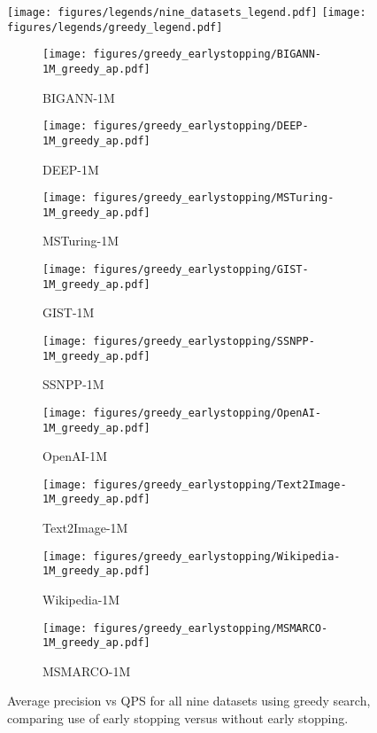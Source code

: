 \begin{figure*}
	\centering
	\texttt{[image: figures/legends/nine\_datasets\_legend.pdf]}
	\texttt{[image: figures/legends/greedy\_legend.pdf]} \\
	\begin{subfigure}{.33\textwidth}
		\texttt{[image: figures/greedy\_earlystopping/BIGANN-1M\_greedy\_ap.pdf]}
		\caption{BIGANN-1M}\label{fig:bigannpp_greedy}
	\end{subfigure} 
	\begin{subfigure}{.33\textwidth}
		\texttt{[image: figures/greedy\_earlystopping/DEEP-1M\_greedy\_ap.pdf]}
		\caption{DEEP-1M}\label{fig:deeppp_greedy}
	\end{subfigure}
	\begin{subfigure}{.33\textwidth}
		\texttt{[image: figures/greedy\_earlystopping/MSTuring-1M\_greedy\_ap.pdf]}
		\caption{MSTuring-1M}\label{fig:msturingpp_greedy}
	\end{subfigure}\hfil
	\begin{subfigure}{.3\textwidth}
		\texttt{[image: figures/greedy\_earlystopping/GIST-1M\_greedy\_ap.pdf]}
		\caption{GIST-1M}\label{fig:gistpp_greedy}
	\end{subfigure} 
	\begin{subfigure}{.33\textwidth}
		\texttt{[image: figures/greedy\_earlystopping/SSNPP-1M\_greedy\_ap.pdf]}
		\caption{SSNPP-1M}\label{fig:ssnpppp_greedy}
	\end{subfigure}
	\begin{subfigure}{.33\textwidth}
		\texttt{[image: figures/greedy\_earlystopping/OpenAI-1M\_greedy\_ap.pdf]}
		\caption{OpenAI-1M}\label{fig:openaipp_greedy}
	\end{subfigure}\hfil
	\begin{subfigure}{.33\textwidth}
		\texttt{[image: figures/greedy\_earlystopping/Text2Image-1M\_greedy\_ap.pdf]}
		\caption{Text2Image-1M}\label{fig:t2ipp_greedy}
	\end{subfigure} 
	\begin{subfigure}{.33\textwidth}
		\texttt{[image: figures/greedy\_earlystopping/Wikipedia-1M\_greedy\_ap.pdf]}
		\caption{Wikipedia-1M}\label{fig:wikipp_greedy}
	\end{subfigure}
	\begin{subfigure}{.33\textwidth}
		\texttt{[image: figures/greedy\_earlystopping/MSMARCO-1M\_greedy\_ap.pdf]}
		\caption{MSMARCO-1M}\label{fig:msmarcopp_greedy}
	\end{subfigure}
	\caption{Average precision vs QPS for all nine datasets using greedy search, comparing use of early stopping versus without early stopping.}
	\label{fig:ppgraphearlystoppinggreedy}
\end{figure*}

